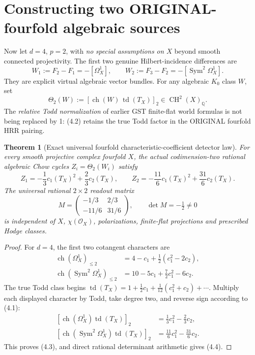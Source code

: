 \documentclass[11pt]{article}
\newcommand{\Q}{\mathbb Q}
\newcommand{\CH}{\operatorname{CH}}
\newcommand{\ch}{\operatorname{ch}}
\newcommand{\td}{\operatorname{td}}
\newcommand{\Sym}{\operatorname{Sym}}
\newtheorem{theorem}{Theorem}[section]
\begin{document}
\section{Constructing two ORIGINAL-fourfold algebraic sources}
Now let \(d=4\), \(p=2\), with \emph{no special assumptions on \(X\)}
beyond smooth connected projectivity. The first two genuine
Hilbert-incidence differences are
\[
 \boxed{W_1:=F_2-F_1=-[\Omega_X^1],\qquad
        W_2:=F_3-F_2=-[\Sym^2\Omega_X^1].}          \tag{4.1}
\]
They are explicit virtual algebraic vector bundles. For any
algebraic \(K_0\) class \(W\), set
\[
 \Theta_2(W)
    :=[\ch(W)\,\td(T_X)]_2\in\CH^2(X)_{\Q}.           \tag{4.2}
\]
The \emph{relative Todd normalization} of earlier GST finite-flat
world formulas is not being replaced by 1: (4.2) retains the true
Todd factor in the ORIGINAL fourfold HRR pairing.

\begin{theorem}[Exact universal fourfold characteristic-coefficient detector law]
For every smooth projective complex fourfold \(X\), the actual
codimension-two rational algebraic Chow cycles
\(Z_i=\Theta_2(W_i)\) satisfy
\[
 \boxed{
 Z_1=-\frac13c_1(T_X)^2+\frac23c_2(T_X),\qquad
 Z_2=-\frac{11}{6}c_1(T_X)^2+\frac{31}{6}c_2(T_X).
 }                                                     \tag{4.3}
\]
The universal rational \(2\times2\) readout matrix
\[
 M=
 \begin{pmatrix}
 -1/3&2/3\\ -11/6&31/6
 \end{pmatrix},
 \qquad
 \boxed{\det M=-\tfrac12\ne0}                         \tag{4.4}
\]
is independent of \(X\), \(\chi(\mathcal O_X)\), polarizations,
finite-flat projections and prescribed Hodge classes.
\end{theorem}
\begin{proof}
For \(d=4\), the first two cotangent characters are
\[
\begin{split}
 \ch(\Omega_X^1)_{\le2}
   &=4-c_1+\tfrac12(c_1^2-2c_2),\\
 \ch(\Sym^2\Omega_X^1)_{\le2}
   &=10-5c_1+\tfrac72 c_1^2-6c_2 .
\end{split}
\]
The true Todd class begins
\(
 \td(T_X)=1+\frac12c_1+\frac1{12}(c_1^2+c_2)+\cdots.
\)
Multiply each displayed character by Todd, take degree two,
and reverse sign according to (4.1):
\[
\begin{split}
 [\ch(\Omega_X^1)\td(T_X)]_2
     &=\tfrac13 c_1^2-\tfrac23 c_2,\\
 [\ch(\Sym^2\Omega_X^1)\td(T_X)]_2
     &=\tfrac{11}{6}c_1^2-\tfrac{31}{6}c_2.
\end{split}
\]
This proves (4.3), and direct rational determinant arithmetic
gives (4.4).
\end{proof}
\end{document}

